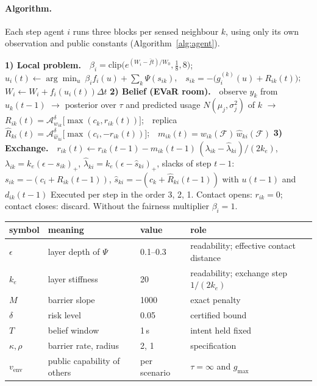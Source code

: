 \documentclass[11pt]{article}
\theoremstyle{definition}
\theoremstyle{remark}
\newcommand{\A}{\mathcal{A}}
\newcommand{\F}{\mathcal{F}}
\begin{document}
\paragraph{Algorithm.} Each step agent $i$ runs three blocks per sensed neighbour $k$, using only its own observation and public constants (Algorithm~\ref{alg:agent}).

\begin{algorithm}[H]
\small
\DontPrintSemicolon
\caption{Agent $i$, one step}\label{alg:agent}
\BlankLine
\textbf{1) Local problem.}\ \ $\beta_i=\mathrm{clip}\big(e^{(W_i-\bar ft)/W_0},\tfrac18,8\big)$;\ \ $u_i(t)\leftarrow\arg\min_u\ \beta_if_i(u)+\sum_k\Psi(s_{ik})$,\ \ $s_{ik}=-\big(g^{(k)}_i(u)+R_{ik}(t)\big)$;\ \ $W_i\leftarrow W_i+f_i(u_i(t))\Delta t$\;
\BlankLine
\textbf{2) Belief (EVaR room).}\ \ observe $y_k$ from $u_k(t-1)$ $\to$ posterior over $\tau$ and predicted usage $N(\mu_j,\sigma_j^2)$ of $k$ $\to$\;
\Indp $R_{ik}(t)=\A^\delta_{w_{ik}}\big[\max(c_k,r_{ik}(t))\big]$;\ \ replica $\hat R_{ki}(t)=\A^\delta_{\hat w_{ki}}\big[\max(c_i,-r_{ik}(t))\big]$;\ \ $m_{ik}(t)=w_{ik}(\F)\,\hat w_{ki}(\F)$\;\Indm
\BlankLine
\textbf{3) Exchange.}\ \ $r_{ik}(t)\leftarrow r_{ik}(t{-}1)-m_{ik}(t{-}1)\,(\lambda_{ik}-\hat\lambda_{ki})/(2k_e)$,\ \ $\lambda_{ik}=k_e(\epsilon-s_{ik})_+$, $\hat\lambda_{ki}=k_e(\epsilon-\hat s_{ki})_+$, slacks of step $t{-}1$: $s_{ik}=-(c_i+R_{ik}(t{-}1))$, $\hat s_{ki}=-(c_k+\hat R_{ki}(t{-}1))$ with $u(t{-}1)$ and $d_{ik}(t{-}1)$\;
\BlankLine
\footnotesize Executed per step in the order 3, 2, 1. Contact opens: $r_{ik}=0$; contact closes: discard. Without the fairness multiplier $\beta_i=1$.
\end{algorithm}

\begin{center}
\small
\begin{tabular}{llll}
\toprule
symbol & meaning & value & role\\
\midrule
$\epsilon$ & layer depth of $\Psi$ & 0.1--0.3 & readability; effective contact distance\\
$k_e$ & layer stiffness & 20 & readability; exchange step $1/(2k_e)$\\
$M$ & barrier slope & 1000 & exact penalty\\
$\delta$ & risk level & 0.05 & certified bound\\
$T$ & belief window & 1\,s & intent held fixed\\
$\kappa,\rho$ & barrier rate, radius & 2, 1 & specification\\
$v_{\mathrm{env}}$ & public capability of others & per scenario & $\tau=\infty$ and $g_{\max}$\\
\bottomrule
\end{tabular}
\end{center}
\end{document}

